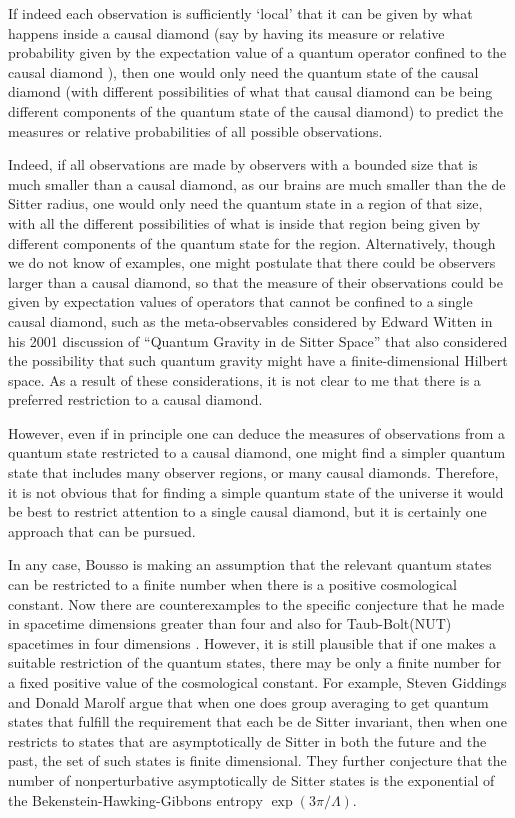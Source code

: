 \documentclass[12pt]{article}
\begin{document}
If indeed each observation is sufficiently `local' that it can be given by what happens inside a causal diamond (say by having its measure or relative probability given by the expectation value of a quantum operator confined to the causal diamond \cite{Page:1995dc,Page:1995kw,Page:2000cs,Page:2001ba, Page:2008mx,Page:2008ns,Page:2009qe,Page:2011sr}), then one would only need the quantum state of the causal diamond (with different possibilities of what that causal diamond can be being different components of the quantum state of the causal diamond) to predict the measures or relative probabilities of all possible observations.  

Indeed, if all observations are made by observers with a bounded size that is much smaller than a causal diamond, as our brains are much smaller than the de Sitter radius, one would only need the quantum state in a region of that size, with all the different possibilities of what is inside that region being given by different components of the quantum state for the region.  Alternatively, though we do not know of examples, one might postulate that there could be observers larger than a causal diamond, so that the measure of their observations could be given by expectation values of operators that cannot be confined to a single causal diamond, such as the meta-observables considered by Edward Witten in his 2001 discussion of ``Quantum Gravity in de Sitter Space'' \cite{Witten:2001kn} that also considered the possibility that such quantum gravity might have a finite-dimensional Hilbert space.  As a result of these considerations, it is not clear to me that there is a preferred restriction to a causal diamond.

However, even if in principle one can deduce the measures of observations from a quantum state restricted to a causal diamond, one might find a simpler quantum state that includes many observer regions, or many causal diamonds.  Therefore, it is not obvious that for finding a simple quantum state of the universe it would be best to restrict attention to a single causal diamond, but it is certainly one approach that can be pursued.

In any case, Bousso is making an assumption that the relevant quantum states can be restricted to a finite number when there is a positive cosmological constant. Now there are counterexamples to the specific conjecture that he made in spacetime dimensions greater than four \cite{Bousso:2002fi} and also for Taub-Bolt(NUT) spacetimes in four dimensions \cite{Clarkson:2003kt,Clarkson:2004yp}.  However, it is still plausible that if one makes a suitable restriction of the quantum states, there may be only a finite number for a fixed positive value of the cosmological constant.  For example, Steven Giddings and Donald Marolf \cite{Giddings:2007nu} argue that when one does group averaging to get quantum states that fulfill the requirement that each be de Sitter invariant, then when one restricts to states that are asymptotically de Sitter in both the future and the past, the set of such states is finite dimensional.  They further conjecture that the number of nonperturbative asymptotically de Sitter states is the exponential of the Bekenstein-Hawking-Gibbons entropy $\exp{(3\pi/\Lambda)}$.
\end{document}
